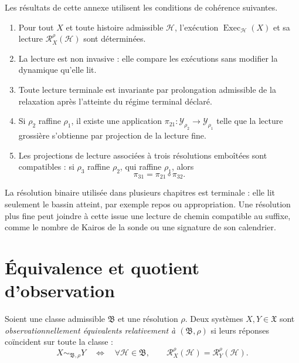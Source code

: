 Les résultats de cette annexe utilisent les conditions de cohérence
suivantes.

\begin{enumerate}
\item[\textnormal{(O1)}]
  Pour tout \(X\) et toute histoire admissible \(\mathcal H\),
  l'exécution \(\operatorname{Exec}_{\mathcal H}(X)\) et sa lecture
  \(\mathcal R_X^\rho(\mathcal H)\) sont déterminées.
\item[\textnormal{(O2)}]
  La lecture est non invasive : elle compare les exécutions sans modifier
  la dynamique qu'elle lit.
\item[\textnormal{(O2$'$)}]
  Toute lecture terminale est invariante par prolongation admissible de
  la relaxation après l'atteinte du régime terminal déclaré.
\item[\textnormal{(O3)}]
  Si \(\rho_2\) raffine \(\rho_1\), il existe une application
  \(\pi_{21}:\mathcal Y_{\rho_2}\to\mathcal Y_{\rho_1}\) telle que la
  lecture grossière s'obtienne par projection de la lecture fine.
\item[\textnormal{(O4)}]
  Les projections de lecture associées à trois résolutions emboîtées
  sont compatibles : si \(\rho_3\) raffine \(\rho_2\), qui raffine
  \(\rho_1\), alors
  \[
  \pi_{31}=\pi_{21}\circ\pi_{32}.
  \]
\end{enumerate}

La résolution binaire utilisée dans plusieurs chapitres est terminale :
elle lit seulement le bassin atteint, par exemple repos ou
appropriation. Une résolution plus fine peut joindre à cette issue une
lecture de chemin compatible au suffixe, comme le nombre de Kairos de la
sonde ou une signature de son calendrier.

\section{Équivalence et quotient d'observation}
\label{annexe-histoires-equivalence}

Soient une classe admissible \(\mathfrak B\) et une résolution
\(\rho\). Deux systèmes \(X,Y\in\mathfrak X\) sont
\emph{observationnellement équivalents relativement à
\((\mathfrak B,\rho)\)} si leurs réponses coïncident sur toute la
classe :
\begin{equation}
\label{eq:annexe-G-equivalence}
X\sim_{\mathfrak B,\rho}Y
\quad\Longleftrightarrow\quad
\forall\mathcal H\in\mathfrak B,
\qquad
\mathcal R_X^\rho(\mathcal H)
=
\mathcal R_Y^\rho(\mathcal H).
\end{equation}

